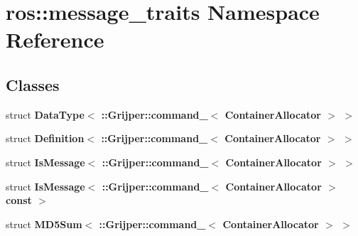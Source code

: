 \section{ros\-:\-:message\-\_\-traits Namespace Reference}
\label{namespaceros_1_1message__traits}
\subsection*{Classes}
\begin{DoxyCompactItemize}
\item 
struct {\bf Data\-Type$<$ \-::\-Grijper\-::command\-\_\-$<$ Container\-Allocator $>$ $>$}
\item 
struct {\bf Definition$<$ \-::\-Grijper\-::command\-\_\-$<$ Container\-Allocator $>$ $>$}
\item 
struct {\bf Is\-Message$<$ \-::\-Grijper\-::command\-\_\-$<$ Container\-Allocator $>$ $>$}
\item 
struct {\bf Is\-Message$<$ \-::\-Grijper\-::command\-\_\-$<$ Container\-Allocator $>$const  $>$}
\item 
struct {\bf M\-D5\-Sum$<$ \-::\-Grijper\-::command\-\_\-$<$ Container\-Allocator $>$ $>$}
\end{DoxyCompactItemize}
